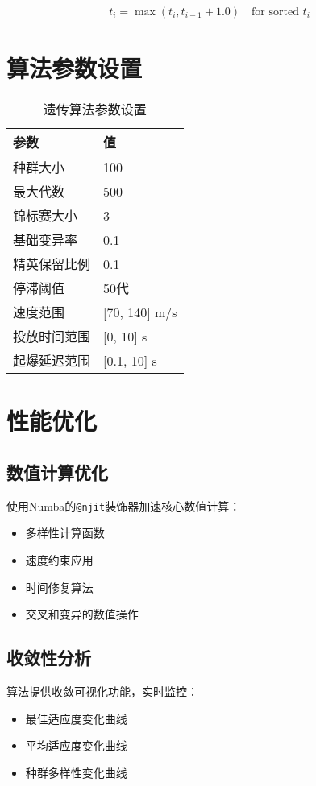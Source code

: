 \documentclass{article}
\begin{document}
\begin{align}
t_i = \max(t_i, t_{i-1} + 1.0) \quad \text{for sorted } t_i
\end{align}

\section{算法参数设置}

\begin{table}[h]
\centering
\begin{tabular}{|l|l|}
\hline
参数 & 值 \\
\hline
种群大小 & 100 \\
最大代数 & 500 \\
锦标赛大小 & 3 \\
基础变异率 & 0.1 \\
精英保留比例 & 0.1 \\
停滞阈值 & 50代 \\
速度范围 & [70, 140] m/s \\
投放时间范围 & [0, 10] s \\
起爆延迟范围 & [0.1, 10] s \\
\hline
\end{tabular}
\caption{遗传算法参数设置}
\end{table}

\section{性能优化}

\subsection{数值计算优化}
使用Numba的\texttt{@njit}装饰器加速核心数值计算：
\begin{itemize}
    \item 多样性计算函数
    \item 速度约束应用
    \item 时间修复算法
    \item 交叉和变异的数值操作
\end{itemize}

\subsection{收敛性分析}
算法提供收敛可视化功能，实时监控：
\begin{itemize}
    \item 最佳适应度变化曲线
    \item 平均适应度变化曲线
    \item 种群多样性变化曲线
\end{itemize}
\end{document}
